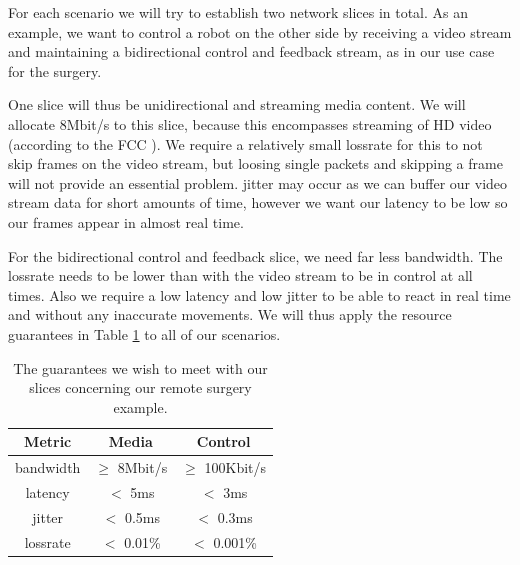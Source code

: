 
For each scenario we will try to establish two network slices in total. As an example, we want to control a robot on the other side by receiving a video stream and maintaining a bidirectional control and feedback stream, as in our use case for the surgery.

One slice will thus be unidirectional and streaming media content. We will allocate 8Mbit/s to this slice, because this encompasses streaming of HD video (according to the FCC \cite{fcc}). We require a relatively small \gls{lossrate} for this to not skip frames on the video stream, but loosing single packets and skipping a frame will not provide an essential problem. \Gls{jitter} may occur as we can buffer our video stream data for short amounts of time, however we want our \gls{latency} to be low so our frames appear in almost real time.

For the bidirectional control and feedback slice, we need far less \gls{bandwidth}. The \gls{lossrate} needs to be lower than with the video stream to be in control at all times. Also we require a low \gls{latency} and low \gls{jitter} to be able to react in real time and without any inaccurate movements. We will thus apply the resource guarantees in Table \ref{table:slices} to all of our scenarios.

\begin{table}[ht]
    \centering
    \begin{tabular}{ |c|c|c| }
        \hline
        \textbf{Metric} & \textbf{Media} & \textbf{Control} \\
        \hline
        \Gls{bandwidth} & $\geq$ 8Mbit/s & $\geq$ 100Kbit/s \\
        \Gls{latency}   & $<$ 5ms        & $<$ 3ms          \\
        \Gls{jitter}    & $<$ 0.5ms      & $<$ 0.3ms        \\
        \Gls{lossrate}  & $<$ 0.01\%     & $<$ 0.001\%      \\
        \hline
    \end{tabular}
    \caption[Slice \acrshort{qos} guarantees in our remote surgery example]{The guarantees we wish to meet with our slices concerning our remote surgery example.}
    \label{table:slices}
\end{table}

